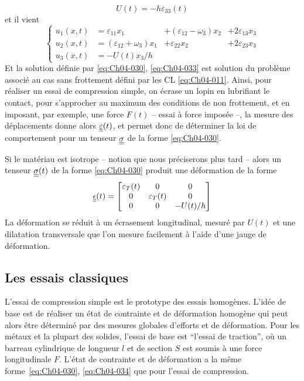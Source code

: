 \begin{equation}
    U(t) = -h \varepsilon_{33}(t)
    \label{eq:Ch04-032}
\end{equation}
et il vient
\begin{equation}
    \left\{
    \begin{aligned}
        u_1(x,t) &= \varepsilon_{11}x_1 &+ (\varepsilon_{12} - \omega_3) x_2 &+ 2\varepsilon_{13}x_3 \\
        u_2(x,t) &= (\varepsilon_{12} + \omega_3) x_1 &+ \varepsilon_{22}x_2 &+ 2\varepsilon_{23}x_3 \\
        u_3(x,t) &= -U(t) x_3/h
    \end{aligned}
    \right.
    \label{eq:Ch04-033}
\end{equation}
Et la solution définie par \eqref{eq:Ch04-030}, \eqref{eq:Ch04-033} est solution du problème associé au cas sans frottement défini par les CL \eqref{eq:Ch04-011}.
Ainsi, pour réaliser un essai de compression simple, on écrase un lopin en lubrifiant le contact, pour s'approcher au maximum des conditions de non frottement, et en imposant, par exemple, une force $F(t)$ -- essai à force imposée --, la mesure des déplacements donne alors $\underline{\underline{\varepsilon}}(t)$, et permet donc de déterminer la loi de comportement pour un tenseur $\underline{\underline{\sigma}}$ de la forme \eqref{eq:Ch04-030}.

Si le matériau est isotrope -- notion que nous préciserons plus tard -- alors un tenseur $\underline{\underline{\sigma}}(t)$ de la forme \eqref{eq:Ch04-030} produit une déformation de la forme
\begin{equation}
    \underline{\underline{\epsilon}} (t) = 
    \begin{bmatrix}
        \varepsilon_T(t) & 0 & 0 \\
        0 & \varepsilon_T (t) & 0 \\
        0 & 0 & -U(t)/h
    \end{bmatrix}
    \label{eq:Ch04-034}
\end{equation}
La déformation se réduit à un écrasement longitudinal, mesuré par $U(t)$ et une dilatation transversale que l'on mesure facilement à l'aide d'une jauge de déformation.

\subsection{Les essais 	classiques} \label{ssec:Ch04-1.4}
L'essai de compression simple est le prototype des essais homogènes.
L'idée de base est de réaliser un état de contrainte et de déformation homogène qui peut alors être déterminé par des mesures globales d'efforts et de déformation.
Pour les métaux et la plupart des solides, l'essai de base est ``l'essai de traction'', où un barreau cylindrique de longueur $l$ et de section $S$ est soumis à une force longitudinale $F$.
L'état de contrainte et de déformation a la même forme~\eqref{eq:Ch04-030}, \eqref{eq:Ch04-034} que pour l'essai de compression.

